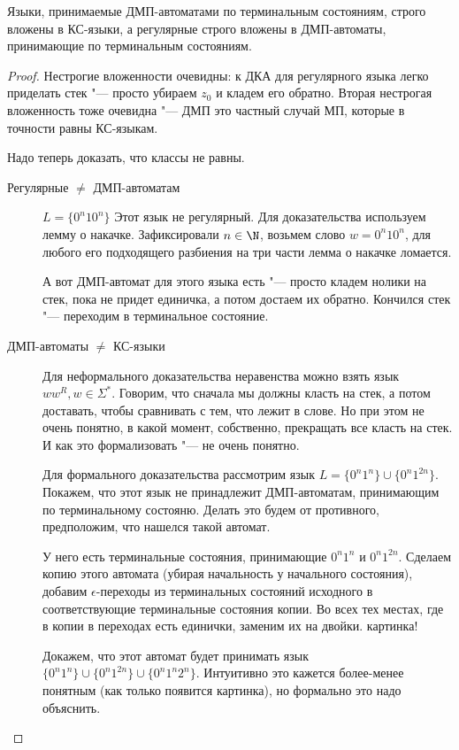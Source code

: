 \begin{theorem}
Языки, принимаемые ДМП-автоматами по терминальным состояниям, строго вложены в КС-языки, а регулярные строго вложены в ДМП-автоматы, принимающие по терминальным состояниям.
\end{theorem}
\begin{proof}
Нестрогие вложенности очевидны: к ДКА для регулярного языка легко приделать стек "--- просто убираем $z_0$ и кладем его обратно.
Вторая нестрогая вложенность тоже очевидна "--- ДМП это частный случай МП, которые в точности равны КС-языкам.

Надо теперь доказать, что классы не равны.

    \begin{description}
\item[Регулярные $\neq$ ДМП-автоматам]

$L = \{0^n10^n\}$
Этот язык не регулярный. Для доказательства используем лемму о накачке. Зафиксировали $n \in \N$, возьмем слово $w = 0^n10^n$, для любого его подходящего разбиения на три части лемма о накачке ломается.

А вот ДМП-автомат для этого языка есть "--- просто кладем нолики на стек, пока не придет единичка, а потом достаем их обратно. 
Кончился стек "--- переходим в терминальное состояние.

\item[ДМП-автоматы $\neq$ КС-языки]

Для неформального доказательства неравенства можно взять язык $ww^R, w \in \Sigma^*$.
Говорим, что сначала мы должны класть на стек, а потом доставать, чтобы сравнивать с тем, что лежит в слове.
Но при этом не очень понятно, в какой момент, собственно, прекращать все класть на стек.
И как это формализовать "--- не очень понятно.

Для формального доказательства рассмотрим язык $L = \{0^n1^n\} \cup \{0^n 1^{2n}\}$.
Покажем, что этот язык не принадлежит ДМП-автоматам, принимающим по терминальному состояню.
Делать это будем от противного, предположим, что нашелся такой автомат.

У него есть терминальные состояния, принимающие $0^n1^n$ и $0^n1^{2n}$.
Сделаем копию этого автомата (убирая начальность у начального состояния), добавим $\epsilon$-переходы из терминальных состояний исходного в соответствующие терминальные состояния копии.
Во всех тех местах, где в копии в переходах есть единички, заменим их на двойки.
\TODO картинка!

Докажем, что этот автомат будет принимать язык $\{0^n1^n\} \cup \{0^n1^{2n}\} \cup \{0^n1^n2^n\}$.
Интуитивно это кажется более-менее понятным (как только появится картинка), но формально это надо объяснить.


\end{description}
\end{proof}
